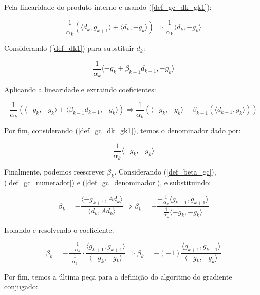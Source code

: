 Pela linearidade do produto interno e usando (\ref{def_gc_dk_gk1}):

\begin{equation*}
\frac{1}{\alpha_k} (\langle d_k, g_{k+1} \rangle + \langle d_k, - g_k \rangle) \Rightarrow \frac{1}{\alpha_k} \langle d_k, - g_k \rangle
\end{equation*}

Considerando (\ref{def_dk1}) para substituir \(d_k\):

\begin{equation}
\frac{1}{\alpha_k} \langle -g_{k} + \beta_{k-1} d_{k-1}, - g_k \rangle
\end{equation}

Aplicando a linearidade e extraindo coeficientes:


\begin{equation}
\frac{1}{\alpha_k}(
\langle -g_{k}, - g_k \rangle +
\langle \beta_{k-1} d_{k-1}, - g_k \rangle
) \Rightarrow
\frac{1}{\alpha_k}(
\langle -g_{k}, - g_k \rangle -
\beta_{k-1}(\langle d_{k-1}, g_k \rangle)
)
\end{equation}

Por fim, considerando (\ref{def_gc_dk_gk1}), temos o denominador dado por:

\begin{equation}
\label{def_gc_denominador}
\frac{1}{\alpha_k} \langle -g_{k}, - g_k \rangle
\end{equation}


Finalmente, podemos reescrever \(\beta_k\). Considerando (\ref{def_beta_gc}), (\ref{def_gc_numerador}) e (\ref{def_gc_denominador}), e substituindo:

\begin{equation}
\beta_k = - \frac{\langle -g_{k+1}, Ad_k \rangle}{\langle d_k, Ad_k \rangle} \Rightarrow \beta_k = - \frac{-\frac{1}{\alpha_k} \langle g_{k+1}, g_{k+1} \rangle}{\frac{1}{\alpha_k} \langle -g_{k}, - g_k \rangle}
\end{equation}

Isolando e resolvendo o coeficiente:

\begin{equation}
  \beta_k = - \frac{-\frac{1}{\alpha_k}}{\frac{1}{\alpha_k}} \cdot \frac{\langle g_{k+1}, g_{k+1} \rangle}{\langle -g_{k}, - g_k \rangle}   \Rightarrow \beta_k = - (-1) \frac{\langle g_{k+1}, g_{k+1} \rangle}{\langle -g_{k}, - g_k \rangle}
\end{equation}

Por fim, temos a última peça para a definição do algoritmo do gradiente conjugado:

